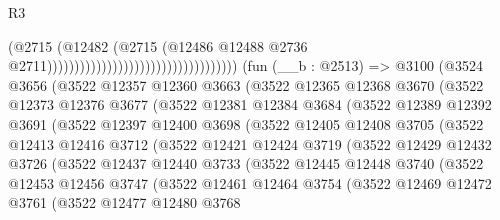 \begin{lexlean}{R3}
\begin{coremodule}
                                                                  (@2715
                                                                    (@12482
                                                                      (@2715
                                                                        (@12486
                                                                          @12488
                                                                          @2736
                                                                          @2711)))))))))))))))))))))))))))))))))))
    (fun (__b : @2513) =>
    @3100
      (@3524
        @3656
        (@3522
          @12357
          @12360
          @3663
          (@3522
            @12365
            @12368
            @3670
            (@3522
              @12373
              @12376
              @3677
              (@3522
                @12381
                @12384
                @3684
                (@3522
                  @12389
                  @12392
                  @3691
                  (@3522
                    @12397
                    @12400
                    @3698
                    (@3522
                      @12405
                      @12408
                      @3705
                      (@3522
                        @12413
                        @12416
                        @3712
                        (@3522
                          @12421
                          @12424
                          @3719
                          (@3522
                            @12429
                            @12432
                            @3726
                            (@3522
                              @12437
                              @12440
                              @3733
                              (@3522
                                @12445
                                @12448
                                @3740
                                (@3522
                                  @12453
                                  @12456
                                  @3747
                                  (@3522
                                    @12461
                                    @12464
                                    @3754
                                    (@3522
                                      @12469
                                      @12472
                                      @3761
                                      (@3522
                                        @12477
                                        @12480
                                        @3768

\end{coremodule}
\end{lexlean}
